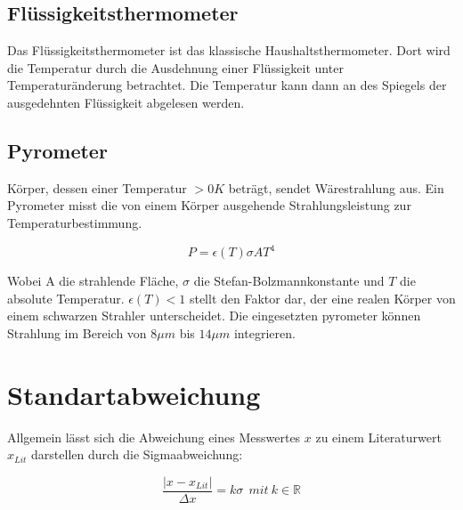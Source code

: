 \subsection{Flüssigkeitsthermometer}
Das Flüssigkeitsthermometer ist das klassische Haushaltsthermometer. Dort wird die Temperatur durch die
Ausdehnung einer Flüssigkeit unter Temperaturänderung betrachtet. Die Temperatur kann dann an des Spiegels der ausgedehnten Flüssigkeit abgelesen werden.

\subsection{Pyrometer}
Körper, dessen einer Temperatur $>0K$ beträgt, sendet Wärestrahlung aus.
Ein Pyrometer misst die von einem Körper ausgehende Strahlungsleistung zur Temperaturbestimmung.

\begin{equation}
    P = \epsilon(T) \sigma A T^4
\end{equation}

Wobei A die strahlende Fläche, $\sigma$ die Stefan-Bolzmannkonstante und $T$ die absolute Temperatur.
$\epsilon(T) < 1$ stellt den Faktor dar, der eine realen Körper von einem schwarzen Strahler unterscheidet.
Die eingesetzten pyrometer können Strahlung im Bereich von $8 \mu m$ bis $14 \mu m$ integrieren.

\section{Standartabweichung}
Allgemein lässt sich die Abweichung eines Messwertes $x$ zu einem Literaturwert $x_{Lit}$ darstellen durch die Sigmaabweichung:

\begin{equation}
    \frac{|x-x_{Lit}|}{\Delta x} = k \sigma \ \ mit \ k \in \mathbb{R}
    \label{eq:sigma}
\end{equation}